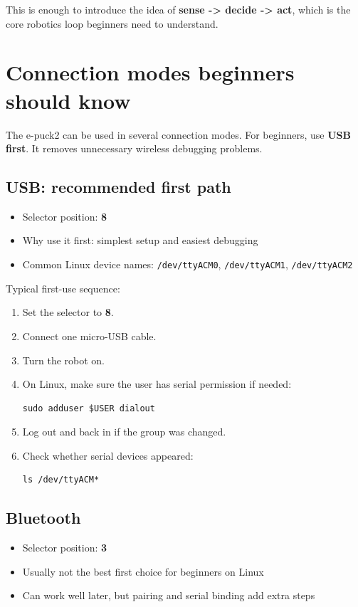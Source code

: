 \documentclass[11pt]{article}
\begin{document}
This is enough to introduce the idea of \textbf{sense -> decide -> act}, which is the core robotics loop beginners need to understand.

\section{Connection modes beginners should know}
The e-puck2 can be used in several connection modes. For beginners, use \textbf{USB first}. It removes unnecessary wireless debugging problems.

\subsection{USB: recommended first path}
\begin{itemize}
  \item Selector position: \textbf{8}
  \item Why use it first: simplest setup and easiest debugging
  \item Common Linux device names: \texttt{/dev/ttyACM0}, \texttt{/dev/ttyACM1}, \texttt{/dev/ttyACM2}
\end{itemize}

Typical first-use sequence:
\begin{enumerate}
  \item Set the selector to \textbf{8}.
  \item Connect one micro-USB cable.
  \item Turn the robot on.
  \item On Linux, make sure the user has serial permission if needed:
\begin{verbatim}
sudo adduser $USER dialout
\end{verbatim}
  \item Log out and back in if the group was changed.
  \item Check whether serial devices appeared:
\begin{verbatim}
ls /dev/ttyACM*
\end{verbatim}
\end{enumerate}

\subsection{Bluetooth}
\begin{itemize}
  \item Selector position: \textbf{3}
  \item Usually not the best first choice for beginners on Linux
  \item Can work well later, but pairing and serial binding add extra steps
\end{itemize}
\end{document}
